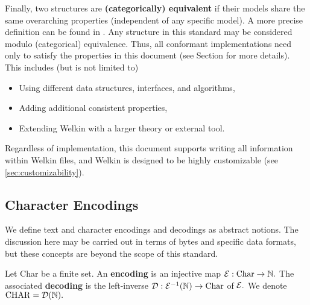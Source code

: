 Finally, two structures are \textbf{(categorically) equivalent} if their models share the same overarching properties (independent of any specific model). A more precise definition can be found in \cite{theory-equivalence}. Any structure in this standard may be considered modulo (categorical) equivalence. Thus, all conformant implementations need only to satisfy the properties in this document (see Section \label{sec:conformance} for more details). This includes (but is not limited to)
\begin{itemize}
  \item Using different data structures, interfaces, and algorithms,
  \item Adding additional consistent properties,
  \item Extending Welkin with a larger theory or external tool.
\end{itemize}

Regardless of implementation, this document supports writing all information within Welkin files, and Welkin is designed to be highly customizable (see \ref{sec:customizability}).

\subsection{Character Encodings}
We define text and character encodings and decodings as abstract notions. The discussion here may be carried out in terms of bytes and specific data formats, but these concepts are beyond the scope of this standard.

\begin{definition}[Encodings]
  Let Char be a finite set. An \textbf{encoding} is an injective map $\mathcal{E} : \mathrm{Char} \to \mathbb{N}.$ The associated \textbf{decoding} is the left-inverse ${\mathcal{D}: \mathcal{E}^{-1}(\mathbb{N}) \to \mathrm{Char}}$ of $\mathcal{E}.$ We denote $\mathrm{CHAR} = \mathcal{D}(\mathbb{N}).$
\end{definition}

